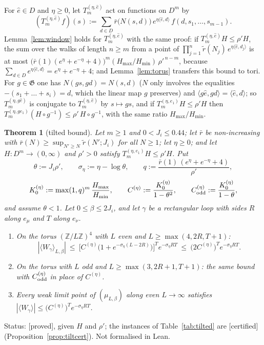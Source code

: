 \documentclass[11pt,a4paper]{article}
\theoremstyle{plain}
\newtheorem{theorem}{Theorem}[section]
\theoremstyle{remark}
\numberwithin{equation}{section}
\newcommand{\Z}{\mathbb{Z}}
\newcommand{\rt}{\widetilde r}
\newcommand{\rb}{\bar r}
\newcommand{\st}[1]{\textsf{[#1]}}
\begin{document}
For $\hat e\in D$ and $\eta\ge0$, let $T_m^{(\eta,\hat e)}$ act on functions on $D^m$ by
\[
(T_m^{(\eta,\hat e)}f)(s):=\sum_{d\in D}\rb\big(N(s,d)\big)\,e^{\eta\langle\hat e,d\rangle}\,f(d,s_1,\dots,s_{m-1}).
\]
Lemma~\ref{lem:window} holds for $T_m^{(\eta,\hat e)}$ with the same proof: if $T_m^{(\eta,\hat e)}H\le\rho'H$, the sum over the walks of
length $n\ge m$ from a point of $\prod_{j=1}^{n}\rt(N_j)\,e^{\eta\langle\hat e,d_j\rangle}$ is at most
$\big(\rb(1)(e^{\eta}+e^{-\eta}+4)\big)^m(H_{\max}/H_{\min})\,\rho'^{\,n-m}$, because $\sum_{d\in D}e^{\eta\langle\hat e,d\rangle}=e^\eta+e^{-\eta}+4$;
and Lemma~\ref{lem:torus} transfers this bound to tori. For $g\in\mathfrak G$ one has $N(gs,gd)=N(s,d)$ ($N$ only involves the equalities
$-(s_1+\dots+s_i)=d$, which the linear map $g$ preserves) and $\langle g\hat e,gd\rangle=\langle\hat e,d\rangle$; so $T_m^{(\eta,g\hat e)}$ is
conjugate to $T_m^{(\eta,\hat e)}$ by $s\mapsto gs$, and if $T_m^{(\eta,e_1)}H\le\rho'H$ then $T_m^{(\eta,ge_1)}(H\circ g^{-1})\le
\rho'\,H\circ g^{-1}$, with the same ratio $H_{\max}/H_{\min}$.

\begin{theorem}[tilted bound]\label{thm:tilted}
Let $m\ge1$ and $0<J_i\le0.44$; let $\rb$ be non-increasing with $\rb(N)\ge\sup_{N'\ge N}\rt(N';J_i)$ for all $N\ge1$; let $\eta\ge0$; and
let $H:D^m\to(0,\infty)$ and $\rho'>0$ satisfy $T_m^{(\eta,e_1)}H\le\rho'H$. Put
\[
\theta:=J_i\rho',\qquad \sigma_\eta:=\eta-\log\theta,\qquad q:=\frac{\rb(1)\,(e^{\eta}+e^{-\eta}+4)}{\rho'},
\]
\[
K_0^{(\eta)}:=\max(1,q)^{m}\,\frac{H_{\max}}{H_{\min}},\qquad C^{(\eta)}:=\frac{K_0^{(\eta)}}{1-\theta^{2}},\qquad
C_{\rm odd}^{(\eta)}:=\frac{K_0^{(\eta)}}{1-\theta},
\]
and assume $\theta<1$. Let $0\le\beta\le2J_i$, and let $\gamma$ be a rectangular loop with sides $R$ along $e_\mu$ and $T$ along $e_\nu$.
\begin{enumerate}
\item On the torus $(\Z/L\Z)^4$ with $L$ even and $L\ge\max(4,2R,T+1)$:
\[
|\langle W_\gamma\rangle_{L,\beta}|\ \le\ \big[C^{(\eta)}\big(1+e^{-\sigma_\eta(L-2R)}\big)\big]^{T}e^{-\sigma_\eta RT}\ \le\
\big(2C^{(\eta)}\big)^{T}e^{-\sigma_\eta RT}.
\]
\item On the torus with $L$ odd and $L\ge\max(3,2R+1,T+1)$: the same bound with $C_{\rm odd}^{(\eta)}$ in place of $C^{(\eta)}$.
\item Every weak limit point of $(\mu_{L,\beta})$ along even $L\to\infty$ satisfies
$|\langle W_\gamma\rangle|\le\big(C^{(\eta)}\big)^{T}e^{-\sigma_\eta RT}$.
\end{enumerate}
\end{theorem}
\noindent Status: \st{proved}, given $H$ and $\rho'$; the instances of Table~\ref{tab:tilted} are \st{certified}
(Proposition~\ref{prop:tiltcert}). Not formalised in Lean.
\end{document}

